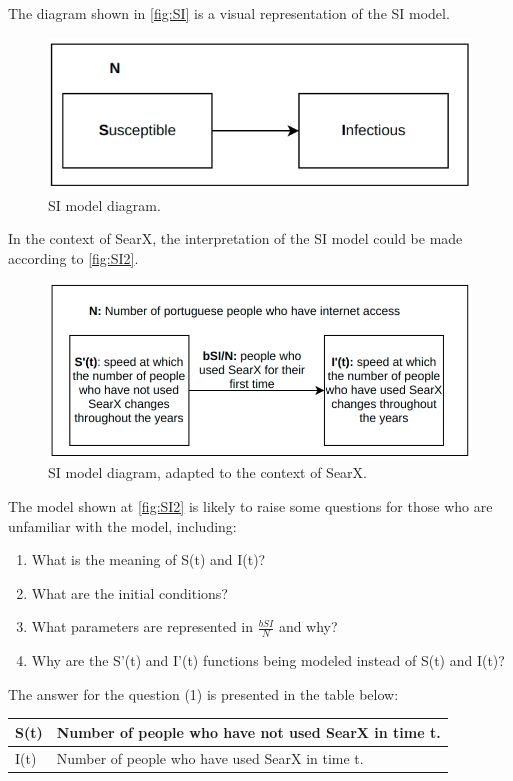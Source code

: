 \documentclass{article}
\begin{document}
The diagram shown in \autoref{fig:SI} is a visual representation of the SI model.

\begin{figure}[h]
    \centering
    \includegraphics[width=0.5\linewidth]{SI}
    \caption{SI model diagram.}
    \label{fig:SI}
\end{figure}

In the context of SearX, the interpretation of the SI model could be made according to \autoref{fig:SI2}.

\begin{figure}[h]
    \centering
    \includegraphics[width=0.5\linewidth]{SI2}
    \caption{SI model diagram, adapted to the context of SearX.}
    \label{fig:SI2}
\end{figure} 

The model shown at \autoref{fig:SI2} is likely to raise some questions for those who are unfamiliar with the model, including:

\begin{enumerate}
    \item What is the meaning of S(t) and I(t)? 
    \item What are the initial conditions?
    \item What parameters are represented in $\frac{bSI}{N}$ and why?
    \item Why are the S’(t) and I’(t) functions being modeled instead of S(t) and I(t)?
\end{enumerate}

The answer for the question (1) is presented in the table below:

\begin{tabularx}{1\textwidth} { 
    | >{\centering\arraybackslash}X 
    || >{\centering\arraybackslash}X | }
   \hline
   S(t) & Number of people who have not used SearX in time t. \\
   \hline
   I(t)  & Number of people who have used SearX in time t. \\
  \hline
\end{tabularx}
\end{document}
